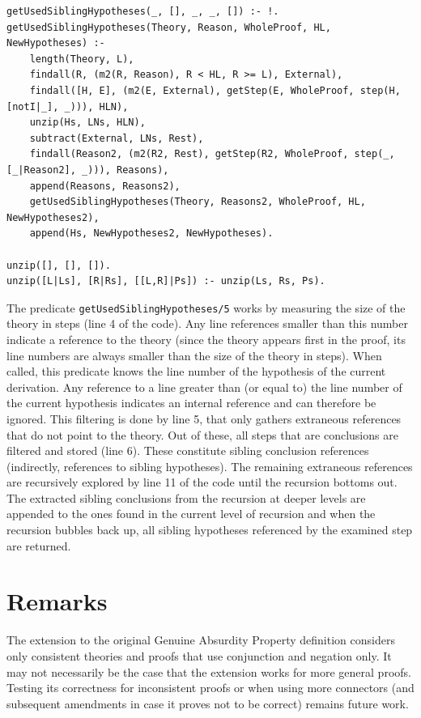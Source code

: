 \documentclass[11pt,twoside,a4paper]{report}
\begin{document}
\begin{lstlisting}[caption={Gathering of referenced sibling derivations for the extended Genuine Absurdity Property definition},label=lst:sibmining]
% Uses the line references to find referenced sibling derivations
getUsedSiblingHypotheses(_, [], _, _, []) :- !.
getUsedSiblingHypotheses(Theory, Reason, WholeProof, HL, NewHypotheses) :-
	length(Theory, L),
	findall(R, (m2(R, Reason), R < HL, R >= L), External),
	findall([H, E], (m2(E, External), getStep(E, WholeProof, step(H, [notI|_], _))), HLN),
	unzip(Hs, LNs, HLN),
	subtract(External, LNs, Rest),
	findall(Reason2, (m2(R2, Rest), getStep(R2, WholeProof, step(_, [_|Reason2], _))), Reasons),
	append(Reasons, Reasons2),
	getUsedSiblingHypotheses(Theory, Reasons2, WholeProof, HL, NewHypotheses2),
	append(Hs, NewHypotheses2, NewHypotheses).
	
unzip([], [], []).
unzip([L|Ls], [R|Rs], [[L,R]|Ps]) :- unzip(Ls, Rs, Ps).
\end{lstlisting}

The predicate \lstinline$getUsedSiblingHypotheses/5$ works by measuring the size of the theory in steps (line 4 of the code). Any line references smaller than this number indicate a reference to the theory (since the theory appears first in the proof, its line numbers are always smaller than the size of the theory in steps). When called, this predicate knows the line number of the hypothesis of the current derivation. Any reference to a line greater than (or equal to) the line number of the current hypothesis indicates an internal reference and can therefore be ignored. This filtering is done by line 5, that only gathers extraneous references that do not point to the theory. Out of these, all steps that are conclusions are filtered and stored (line 6). These constitute sibling conclusion references (indirectly, references to sibling hypotheses). The remaining extraneous references are recursively explored by line 11 of the code until the recursion bottoms out. The extracted sibling conclusions from the recursion at deeper levels are appended to the ones found in the current level of recursion and when the recursion bubbles back up, all sibling hypotheses referenced by the examined step are returned.

\section{Remarks}
The extension to the original Genuine Absurdity Property definition considers only consistent theories and proofs that use conjunction and negation only. It may not necessarily be the case that the extension works for more general proofs. Testing its correctness for inconsistent proofs or when using more connectors (and subsequent amendments in case it proves not to be correct) remains future work.
\end{document}
